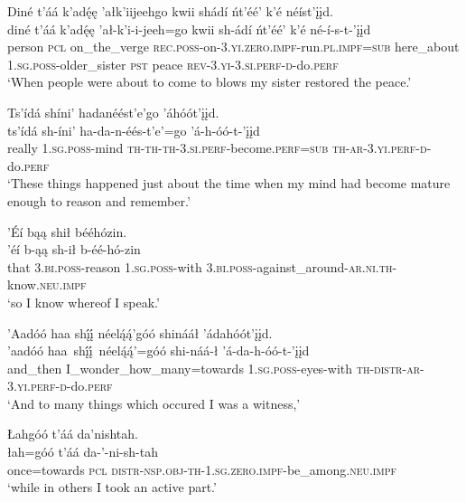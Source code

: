 \ea\label{ex:text3-11-4}
Diné t’áá k’adę́ę ’ałk’iijeehgo kwii shádí ńt’éé’ k’é néíst’įįd.\\
\gll diné	t’áá	k’adę́ę	’ał-k’i-i-jeeh=go	kwii	sh-ádí	ńt’éé’	k’é	né-í-s-t-’įįd\\
     person	\textsc{pcl}	on\_the\_verge	\textsc{rec}.\textsc{poss}-on-3.\textsc{yi}.\textsc{zero}.\textsc{impf}-run.\textsc{pl}.\textsc{impf}=\textsc{sub}	here\_about	1.\textsc{sg}.\textsc{poss}-older\_sister	\textsc{pst}	peace	\textsc{rev}-3.\textsc{yi}-3.\textsc{si}.\textsc{perf}-\textsc{d}-do.\textsc{perf}\\
\glt `When people were about to come to blows my sister restored the peace.'
\z

\ea\label{ex:text3-11-5}
Ts’ídá shíni’ hadanéést’e’go ’áhóót’įįd.\\
\gll ts’ídá	sh-íni’	ha-da-n-éés-t’e’=go	’á-h-óó-t-’įįd\\
     really	1.\textsc{sg}.\textsc{poss}-mind	\textsc{th}-\textsc{th}-\textsc{th}-3.\textsc{si}.\textsc{perf}-become.\textsc{perf}=\textsc{sub}	\textsc{th}-\textsc{ar}-3.\textsc{yi}.\textsc{perf}-\textsc{d}-do.\textsc{perf}\\
\glt `These things happened just about the time when my mind had become mature enough to reason and remember.'
\z

\ea\label{ex:text3-11-6}
’Éí bąą shił bééhózin.\\
\gll ’éí	b-ąą	sh-ił	b-éé-hó-zin\\
     that	3.\textsc{bi}.\textsc{poss}-reason	1.\textsc{sg}.\textsc{poss}-with	3.\textsc{bi}.\textsc{poss}-against\_around-\textsc{ar}.\textsc{ni}.\textsc{th}-know.\textsc{neu}.\textsc{impf}\\
\glt `so I know whereof I speak.'
\z

\ea\label{ex:text3-11-7}
’Aadóó haa shį́į́ néelą́ą́’góó shinááł ’ádahóót’įįd.\\
\gll ’aadóó	haa~shį́į́~{néelą́ą́’=góó}	shi-náá-ł	’á-da-h-óó-t-’įįd\\
     and\_then	I\_wonder\_how\_many=towards	1.\textsc{sg}.\textsc{poss}-eyes-with	\textsc{th}-\textsc{distr}-\textsc{ar}-3.\textsc{yi}.\textsc{perf}-\textsc{d}-do.\textsc{perf}\\
\glt `And to many things which occured I was a witness,'
\z

\ea\label{ex:text3-11-8}
Łahgóó t’áá da’nishtah.\\
\gll łah=góó	t’áá	da-’-ni-sh-tah\\
     once=towards	\textsc{pcl}	\textsc{distr}-\textsc{nsp}.\textsc{obj}-\textsc{th}-1.\textsc{sg}.\textsc{zero}.\textsc{impf}-be\_among.\textsc{neu}.\textsc{impf}\\
\glt `while in others I took an active part.'
\z

